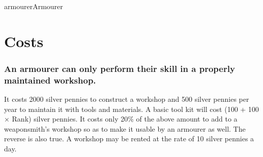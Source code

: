 \begin{Skill}[1.3]{armourer}{Armourer}
\section{Costs}

\subsubsection{An armourer can only perform their skill in a properly maintained
workshop.}

It costs 2000 silver pennies to construct a workshop and 500 silver
pennies per year to maintain it with tools and materials. A basic tool
kit will cost (100 + 100 × Rank) silver pennies.  It costs only 20\%
of the above amount to add to a weaponsmith’s workshop so as to make
it usable by an armourer as well. The reverse is also true.  A
workshop may be rented at the rate of 10 silver pennies a day.

\end{Skill}
